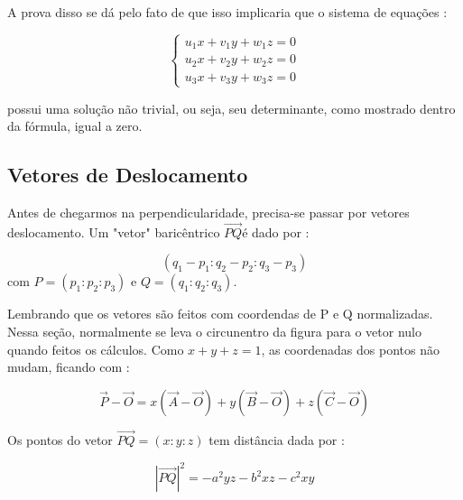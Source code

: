 \documentclass{article}
\begin{document}
A prova disso se dá pelo fato de que isso implicaria que o sistema de equações : 

$$
\begin{cases}
    u_1 x + v_1 y + w_1 z = 0 \\
    u_2 x + v_2 y + w_2 z = 0 \\
    u_3 x + v_3 y + w_3 z = 0
\end{cases}

$$

possui uma solução não trivial, ou seja, seu determinante, como mostrado dentro da fórmula, igual a zero.

\subsection{Vetores de Deslocamento}

Antes de chegarmos na perpendicularidade, precisa-se passar por vetores deslocamento. Um "vetor" baricêntrico $\overrightarrow{PQ}$é dado por : 

$$
(q_1 - p_1 : q_2 - p_2 : q_3 - p_3)
$$
com $P = (p_1 : p_2 : p_3)$ e $Q = (q_1 : q_2 : q_3)$.

Lembrando que os vetores são feitos com coordendas de P e Q normalizadas.
Nessa seção, normalmente se leva o circunentro da figura para o vetor nulo quando feitos os cálculos. Como $x+y+z = 1$, as coordenadas dos pontos não mudam, ficando com : 

$$
\overrightarrow{P} - \overrightarrow{O} = x(\overrightarrow{A} - \overrightarrow{O}) + y(\overrightarrow{B} - \overrightarrow{O}) + z(\overrightarrow{C} - \overrightarrow{O})
$$

\begin{tcolorbox}[colback=green!5!white,colframe=green!75!black,title=Distância baricêntrica\emoji{goblin}]
Os pontos do vetor $\overrightarrow{PQ} = (x:y:z)$ tem distância dada por : 

$$
|\overrightarrow{PQ}|^2 = -a^2yz -  b^2xz - c^2xy
$$
\end{tcolorbox}
\end{document}

